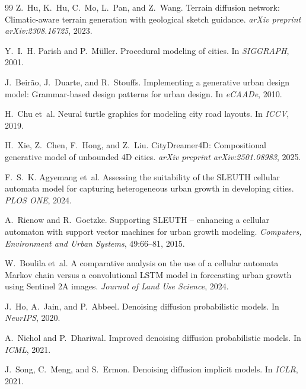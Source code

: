 \documentclass[11pt]{article}
\begin{document}
\begin{thebibliography}{99}
Z.~Hu, K.~Hu, C.~Mo, L.~Pan, and Z.~Wang.
\newblock Terrain diffusion network: Climatic-aware terrain generation with
geological sketch guidance.
\newblock \emph{arXiv preprint arXiv:2308.16725}, 2023.

Y.~I.~H. Parish and P.~M{\"u}ller.
\newblock Procedural modeling of cities.
\newblock In \emph{SIGGRAPH}, 2001.

J.~Beir{\~a}o, J.~Duarte, and R.~Stouffs.
\newblock Implementing a generative urban design model: Grammar-based design
patterns for urban design.
\newblock In \emph{eCAADe}, 2010.

H.~Chu et~al.
\newblock Neural turtle graphics for modeling city road layouts.
\newblock In \emph{ICCV}, 2019.

H.~Xie, Z.~Chen, F.~Hong, and Z.~Liu.
\newblock CityDreamer4D: Compositional generative model of unbounded 4D
cities.
\newblock \emph{arXiv preprint arXiv:2501.08983}, 2025.

F.~S.~K. Agyemang et~al.
\newblock Assessing the suitability of the SLEUTH cellular automata model for
capturing heterogeneous urban growth in developing cities.
\newblock \emph{PLOS ONE}, 2024.

A.~Rienow and R.~Goetzke.
\newblock Supporting SLEUTH -- enhancing a cellular automaton with support
vector machines for urban growth modeling.
\newblock \emph{Computers, Environment and Urban Systems}, 49:66--81, 2015.

W.~Boulila et~al.
\newblock A comparative analysis on the use of a cellular automata Markov
chain versus a convolutional LSTM model in forecasting urban growth using
Sentinel 2A images.
\newblock \emph{Journal of Land Use Science}, 2024.

J.~Ho, A.~Jain, and P.~Abbeel.
\newblock Denoising diffusion probabilistic models.
\newblock In \emph{NeurIPS}, 2020.

A.~Nichol and P.~Dhariwal.
\newblock Improved denoising diffusion probabilistic models.
\newblock In \emph{ICML}, 2021.

J.~Song, C.~Meng, and S.~Ermon.
\newblock Denoising diffusion implicit models.
\newblock In \emph{ICLR}, 2021.


\end{thebibliography}
\end{document}
